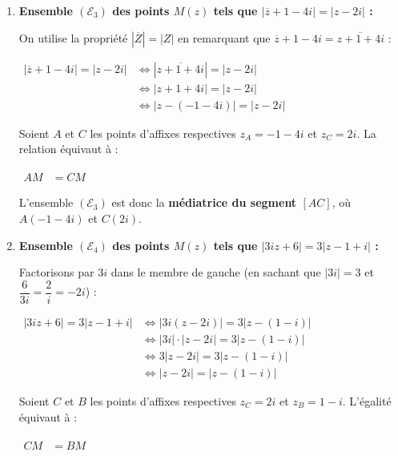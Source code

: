 \documentclass[12pt,a4paper]{article}
\begin{document}
\begin{enumerate}
    L'ensemble $(\mathcal{E}_2)$ est donc le \textbf{cercle de centre $A(-1 - 4i)$ et de rayon $R = 4$}.

    \item \textbf{Ensemble $(\mathcal{E}_3)$ des points $M(z)$ tels que $|\overline{z} + 1 - 4i| = |z - 2i|$ :}
    
    On utilise la propriété $|\overline{Z}| = |Z|$ en remarquant que $\overline{z} + 1 - 4i = \overline{z + 1 + 4i}$ :
    
    $
    \begin{aligned}
        |\overline{z} + 1 - 4i| = |z - 2i| &\iff |\overline{z + 1 + 4i}| = |z - 2i|\\
        &\iff |z + 1 + 4i| = |z - 2i|\\
        &\iff |z - (-1 - 4i)| = |z - 2i|
    \end{aligned}
    $
    
    Soient $A$ et $C$ les points d'affixes respectives $z_A = -1 - 4i$ et $z_C = 2i$. La relation équivaut à :
    
    $
    \begin{aligned}
        AM &= CM
    \end{aligned}
    $
    
    L'ensemble $(\mathcal{E}_3)$ est donc la \textbf{médiatrice du segment $[AC]$}, où $A(-1 - 4i)$ et $C(2i)$.

    \item \textbf{Ensemble $(\mathcal{E}_4)$ des points $M(z)$ tels que $|3iz + 6| = 3|z - 1 + i|$ :}
    
    Factorisons par $3i$ dans le membre de gauche (en sachant que $|3i| = 3$ et $\dfrac{6}{3i} = \dfrac{2}{i} = -2i$) :
    
    $
    \begin{aligned}
        |3iz + 6| = 3|z - 1 + i| &\iff |3i(z - 2i)| = 3|z - (1 - i)|\\
        &\iff |3i| \cdot |z - 2i| = 3|z - (1 - i)|\\
        &\iff 3|z - 2i| = 3|z - (1 - i)|\\
        &\iff |z - 2i| = |z - (1 - i)|
    \end{aligned}
    $
    
    Soient $C$ et $B$ les points d'affixes respectives $z_C = 2i$ et $z_B = 1 - i$. L'égalité équivaut à :
    
    $
    \begin{aligned}
        CM &= BM
    \end{aligned}
    $
    

\end{enumerate}
\end{document}
